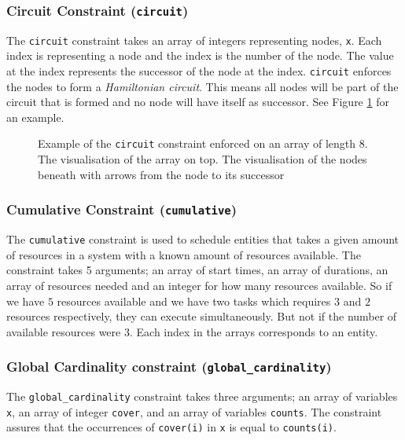 \subsubsection{Circuit Constraint (\texttt{circuit})}
The \texttt{circuit} constraint takes an array of integers representing  nodes, \texttt{x}. Each index is representing a node and the index is the number of the node. The value at the index represents the successor of the node at the index. \texttt{circuit} enforces the nodes to form a \emph{Hamiltonian circuit}. This means all nodes will be part of the circuit that is formed and no node will have itself as successor. See Figure \ref{fig:circuit} for an example.

\begin{figure}
\centering


\caption{Example of the \texttt{circuit} constraint enforced on an array of length 8. The visualisation of the array on top. The visualisation of the nodes beneath with arrows from the node to its successor}
\label{fig:circuit}
\end{figure}

\subsubsection{Cumulative Constraint (\texttt{cumulative})}
The \texttt{cumulative} constraint is used to schedule entities that takes a given amount of resources in a system with a known amount of resources available. The constraint takes 5 arguments; an array of start times, an array of durations, an array of resources needed and an integer for how many resources available. So if we have $5$ resources available and we have two tasks which requires $3$ and $2$ resources respectively, they can execute simultaneously. But not if the number of available resources were $3$. Each index in the arrays corresponds to an entity.

\subsubsection{Global Cardinality constraint (\texttt{global\_cardinality})}
The \texttt{global\_cardinality} constraint takes three arguments; an array of variables \texttt{x}, an array of integer \texttt{cover}, and an array of variables \texttt{counts}. The constraint assures that the occurrences of \texttt{cover(i)} in \texttt{x} is equal to \texttt{counts(i)}.

\newpage

